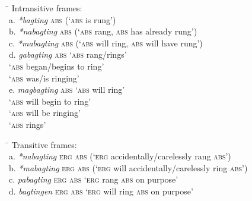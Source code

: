 \ea
\label{bkm:Ref148517624}
\begin{tabbing}
\hspace{4.5cm} \= \kill
Intransitive frames: \\
a.  \textit{*bagting} \textsc{abs}  \>  (‘\textsc{abs} is rung’) \\
b.  \textit{*nabagting} \textsc{abs}  \>  (‘\textsc{abs} rang, \textsc{abs} has already rung’) \\
c.  \textit{*mabagting} \textsc{abs}  \>  (‘\textsc{abs} will ring, \textsc{abs} will have rung’) \\
d.  \textit{gabagting} \textsc{abs}  \>  ‘\textsc{abs} rang/rings’ \\
\>        ‘\textsc{abs} began/begins to ring’ \\
\>        ‘\textsc{abs} was/is ringing’ \\
e. \textit{magbagting} \textsc{abs}  \>  ‘\textsc{abs} will ring’ \\
\>        ‘\textsc{abs} will begin to ring’ \\
\>        ‘\textsc{abs} will be ringing’ \\
\>        ‘\textsc{abs} rings’
\end{tabbing}
\z
\ea
\begin{tabbing}
\hspace{4.5cm} \= \kill
Transitive frames: \\
a.  \textit{*nabagting} \textsc{erg} \textsc{abs}  \>  (‘\textsc{erg} accidentally/carelessly rang \textsc{abs}’) \\
b.  \textit{*mabagting} \textsc{erg} \textsc{abs}  \>  (‘\textsc{erg} will accidentally/carelessly ring \textsc{abs}’) \\
c.  \textit{pabagting} \textsc{erg} \textsc{abs}  \>  ‘\textsc{erg} rang \textsc{abs} on purpose’ \\
d.  \textit{bagtingen} \textsc{erg} \textsc{abs}  \>  ‘\textsc{erg} will ring \textsc{abs} on purpose’
\end{tabbing}
\z
\ea
\label{bkm:Ref148517629}
